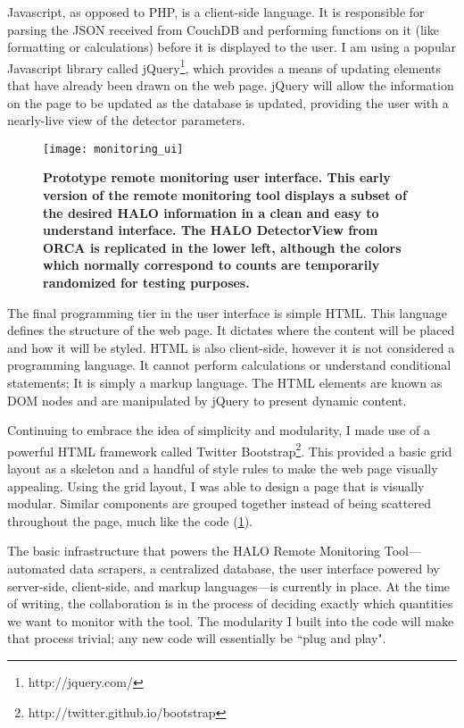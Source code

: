 		Javascript, as opposed to PHP, is a client-side language. It is responsible for parsing the JSON received from CouchDB and performing functions on it (like formatting or calculations) before it is displayed to the user. I am using a popular Javascript library called jQuery\footnote{http://jquery.com/}, which provides a means of updating elements that have already been drawn on the web page. jQuery will allow the information on the page to be updated as the database is updated, providing the user with a nearly-live view of the detector parameters. 

		\begin{figure}[H]
			\texttt{[image: monitoring\_ui]}
			\caption[Prototype Remote Monitoring User Interface]{\bf Prototype remote monitoring user interface. \rm This early version of the remote monitoring tool displays a subset of the desired HALO information in a clean and easy to understand interface. The HALO DetectorView from ORCA is replicated in the lower left, although the colors which normally correspond to counts are temporarily randomized for testing purposes.}
			\label{fig:mon_ui}
		\end{figure}

		The final programming tier in the user interface is simple HTML. This language defines the structure of the web page. It dictates where the content will be placed and how it will be styled. HTML is also client-side, however it is not considered a programming language. It cannot perform calculations or understand conditional statements; It is simply a markup language. The HTML elements are known as DOM nodes and are manipulated by jQuery to present dynamic content.

		Continuing to embrace the idea of simplicity and modularity, I made use of a powerful HTML framework called Twitter Bootstrap\footnote{http://twitter.github.io/bootstrap}. This provided a basic grid layout as a skeleton and a handful of style rules to make the web page visually appealing. Using the grid layout, I was able to design a page that is visually modular. Similar components are grouped together instead of being scattered throughout the page, much like the code (\FIG \ref{fig:mon_ui}). 

		The basic infrastructure that powers the HALO Remote Monitoring Tool---automated data scrapers, a centralized database, the user interface powered by server-side, client-side, and markup languages---is currently in place. At the time of writing, the collaboration is in the process of deciding exactly which quantities we want to monitor with the tool. The modularity I built into the code will make that process trivial; any new code will essentially be ``plug and play". 


